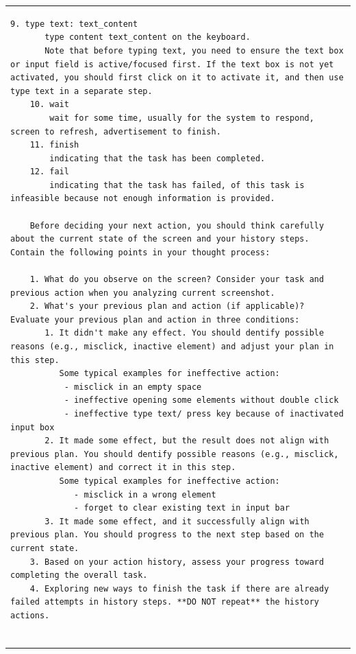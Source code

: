 \documentclass{article} %
\begin{document}
    \clearpage
    \vspace*{-\topskip}
    \vspace{0pt}
    \begin{table}[!t]
    \setlength{\aboverulesep}{0pt}
    \setlength{\belowrulesep}{0pt}
    \setlength{\extrarowheight}{0pt}
    \begin{tabular}{>{\setlength{\parskip}{0.2em}}p{}}
    \begin{lstlisting}[basicstyle=\ttfamily\small] 
    9. type text: text_content
       type content text_content on the keyboard. 
       Note that before typing text, you need to ensure the text box or input field is active/focused first. If the text box is not yet activated, you should first click on it to activate it, and then use type text in a separate step.
    10. wait
        wait for some time, usually for the system to respond, screen to refresh, advertisement to finish.
    11. finish
        indicating that the task has been completed.
    12. fail
        indicating that the task has failed, of this task is infeasible because not enough information is provided.  
    
    Before deciding your next action, you should think carefully about the current state of the screen and your history steps. Contain the following points in your thought process:
    
    1. What do you observe on the screen? Consider your task and previous action when you analyzing current screenshot.
    2. What's your previous plan and action (if applicable)? Evaluate your previous plan and action in three conditions:
       1. It didn't make any effect. You should dentify possible reasons (e.g., misclick, inactive element) and adjust your plan in this step.
          Some typical examples for ineffective action:
           - misclick in an empty space
           - ineffective opening some elements without double click
           - ineffective type text/ press key because of inactivated input box
       2. It made some effect, but the result does not align with previous plan. You should dentify possible reasons (e.g., misclick, inactive element) and correct it in this step.
          Some typical examples for ineffective action:
             - misclick in a wrong element
             - forget to clear existing text in input bar
       3. It made some effect, and it successfully align with previous plan. You should progress to the next step based on the current state.
    3. Based on your action history, assess your progress toward completing the overall task.
    4. Exploring new ways to finish the task if there are already failed attempts in history steps. **DO NOT repeat** the history actions.
    

\end{lstlisting}
\end{tabular}
\end{table}
\end{document}
